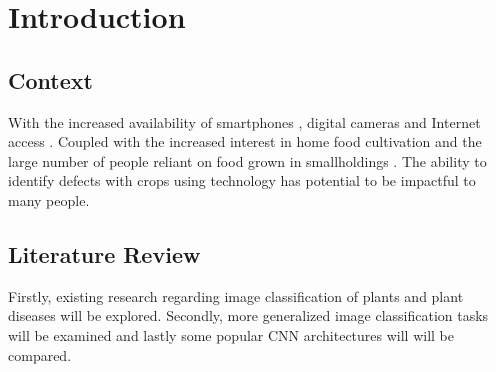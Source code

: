 \chapter{Introduction}
\label{introduction}

\section{Context}
  With the increased availability of smartphones \cite{Statista:2021}, digital cameras \cite{ImarcGroup} and Internet access \cite{Wikipedia} \cite{Globaltt}. Coupled with the increased interest in home food cultivation \cite{Google} and the large number of people reliant on food grown in smallholdings \cite{JLIFADSmallHolders}. The ability to identify defects with crops using technology has potential to be impactful to many people.
\section{Literature Review}
  Firstly, existing research regarding image classification of plants and plant diseases will be
  explored. Secondly, more generalized image classification tasks will be examined and lastly some popular CNN architectures will will be compared.
